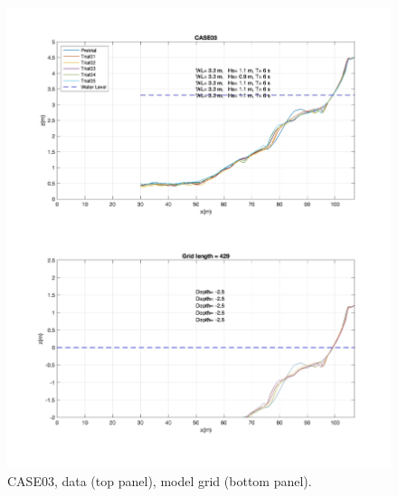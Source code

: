 \documentclass[preprint,10pt]{elsarticle}
\begin{document}
 \begin{figure}
\begin{center}
 \includegraphics[width=1.0\textwidth]{../data/preprocessing/plots/CASE03.jpg}
 \caption{CASE03, data (top panel), model grid (bottom panel).}
 \label{lineargrid}
 \end{center}
 \end{figure}
\end{document}
